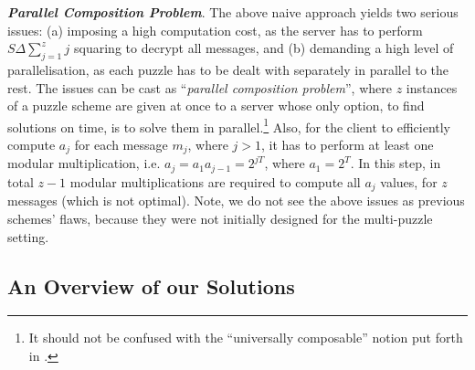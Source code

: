 \noindent\textit{\textbf{Parallel Composition Problem}}. The above naive approach yields two serious issues: (a) imposing a high computation cost, as  the server has to perform $S\Delta \sum\limits_{\scriptscriptstyle j=1}^{\scriptscriptstyle z}j$ squaring to decrypt all   messages, and (b) demanding a high level of parallelisation, as each puzzle has to be dealt with separately in parallel to the rest.  The  issues can be cast  as  ``\emph{parallel composition problem}'', where $z$ instances of a puzzle scheme are given at once to a server whose only option, to find solutions on time, is to solve them in parallel.\footnote{It should not be confused with the ``universally composable'' notion put forth in \cite{Canetti01}.} Also, for the client  to efficiently compute $a_{\scriptscriptstyle j}$  for each  message $m_{\scriptscriptstyle j}$,  where $j>1$, it has to perform at least one modular multiplication, i.e. $a_{\scriptscriptstyle j}=a_{\scriptscriptstyle 1} a_{\scriptscriptstyle j-1}=2^{\scriptscriptstyle j  T}$, where $a_{\scriptscriptstyle 1}=2^{\scriptscriptstyle T}$. In this step, in total $z-1$ modular multiplications are required  to compute all $a_{\scriptscriptstyle j}$ values, for $z$ messages (which is not optimal). Note, we do not see the above issues as  previous schemes' flaws, because they were not initially designed for the multi-puzzle setting.  
 



 \subsection{An Overview of our Solutions}\label{Overview-of-our-Solutions}
 
 
